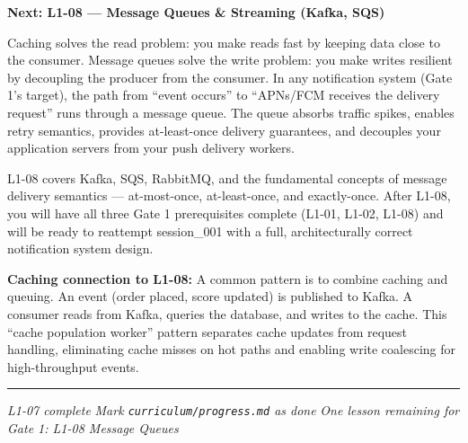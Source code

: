 \documentclass[11pt,a4paper]{article}
\begin{document}
\vspace{16pt}
\begin{insightbox}
\textbf{Next: L1-08 --- Message Queues \& Streaming (Kafka, SQS)}

Caching solves the read problem: you make reads fast by keeping data close to the consumer. Message queues solve the write problem: you make writes resilient by decoupling the producer from the consumer. In any notification system (Gate 1's target), the path from ``event occurs'' to ``APNs/FCM receives the delivery request'' runs through a message queue. The queue absorbs traffic spikes, enables retry semantics, provides at-least-once delivery guarantees, and decouples your application servers from your push delivery workers.

L1-08 covers Kafka, SQS, RabbitMQ, and the fundamental concepts of message delivery semantics --- at-most-once, at-least-once, and exactly-once. After L1-08, you will have all three Gate 1 prerequisites complete (L1-01, L1-02, L1-08) and will be ready to reattempt session\_001 with a full, architecturally correct notification system design.

\textbf{Caching connection to L1-08:} A common pattern is to combine caching and queuing. An event (order placed, score updated) is published to Kafka. A consumer reads from Kafka, queries the database, and writes to the cache. This ``cache population worker'' pattern separates cache updates from request handling, eliminating cache misses on hot paths and enabling write coalescing for high-throughput events.
\end{insightbox}

\vspace{12pt}
{\color{highlight!50}\rule{\linewidth}{0.6pt}}
\begin{center}
\small\color{primary!60}
\textit{L1-07 complete} \quad\textbullet\quad
\textit{Mark \texttt{curriculum/progress.md} as done} \quad\textbullet\quad
\textit{One lesson remaining for Gate 1: L1-08 Message Queues}
\end{center}
\end{document}
